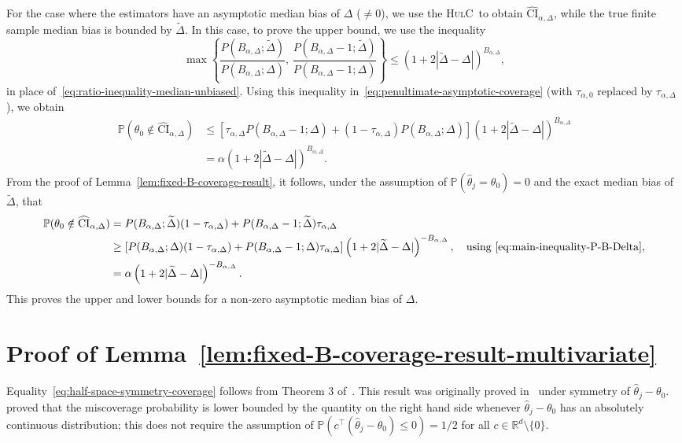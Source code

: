 \documentclass{article}
\newcommand{\hulc}{\textsc{HulC}~}
\numberwithin{myalgctr}{section}
\begin{document}
For the case where the estimators have an asymptotic median bias of $\Delta$ ($\neq 0$), we use the \hulc to obtain $\widehat{\mathrm{CI}}_{\alpha,\Delta}$, while the true finite sample median bias is bounded by $\widetilde{\Delta}$. In this case, to prove the upper bound, we use the inequality
\[
\max\left\{\frac{P(B_{\alpha,\Delta}; \widetilde{\Delta})}{P(B_{\alpha,\Delta}; \Delta)},\,\frac{P(B_{\alpha,\Delta}-1; \widetilde{\Delta})}{P(B_{\alpha,\Delta} - 1; \Delta)}\right\} \le \left(1 + 2|\widetilde{\Delta} - \Delta|\right)^{B_{\alpha,\Delta}},
\]
in place of~\eqref{eq:ratio-inequality-median-unbiased}. Using this inequality in~\eqref{eq:penultimate-asymptotic-coverage} (with $\tau_{\alpha,0}$ replaced by $\tau_{\alpha,\Delta}$), we obtain
\begin{align*}
\mathbb{P}(\theta_0 \notin \widehat{\mathrm{CI}}_{\alpha,\Delta}) &\le \left[\tau_{\alpha,\Delta}P(B_{\alpha,\Delta} - 1; \Delta) + (1 - \tau_{\alpha,\Delta})P(B_{\alpha,\Delta}; \Delta)\right]\left(1 + 2|\widetilde{\Delta} - \Delta|\right)^{B_{\alpha,\Delta}}\\ 
&= \alpha\left(1 + 2|\widetilde{\Delta} - \Delta|\right)^{B_{\alpha,\Delta}}.
\end{align*}
From the proof of Lemma~\ref{lem:fixed-B-coverage-result}, it follows, under the assumption of $\mathbb{P}(\widehat{\theta}_j = \theta_0) = 0$ and the exact median bias of $\widetilde{\Delta}$, that
\begin{align*}
\mathbb{P}(\theta_0 \notin \widehat{\mathrm{CI}}_{\alpha,\Delta}) 
&= P(B_{\alpha,\Delta}; \widetilde{\Delta})(1 - \tau_{\alpha,\Delta}) + P(B_{\alpha,\Delta} - 1; \widetilde{\Delta})\tau_{\alpha,\Delta}\\
&\ge \left[P(B_{\alpha,\Delta}; \Delta)(1 - \tau_{\alpha,\Delta}) + P(B_{\alpha,\Delta} - 1; \Delta)\tau_{\alpha,\Delta}\right]\left(1 + 2|\widetilde{\Delta} - \Delta|\right)^{-B_{\alpha,\Delta}},\quad\mbox{using~\eqref{eq:main-inequality-P-B-Delta},}\\
&= \alpha\left(1 + 2|\widetilde{\Delta} - \Delta|\right)^{-B_{\alpha,\Delta}}.
\end{align*}
This proves the upper and lower bounds for a non-zero asymptotic median bias of $\Delta$.
\section{Proof of Lemma~\ref{lem:fixed-B-coverage-result-multivariate}}\label{appsec:fixed-B-coverage-result-multivariate}
Equality~\eqref{eq:half-space-symmetry-coverage} follows from Theorem 3 of~\cite{hayakawa2021estimating}. This result was originally proved in~\cite{wendel1962problem} under symmetry of $\widehat{\theta}_j - \theta_0$. \cite{wagner2001continuous} proved that the miscoverage probability is lower bounded by the quantity on the right hand side whenever $\widehat{\theta}_j - \theta_0$ has an absolutely continuous distribution; this does not require the assumption of $\mathbb{P}(c^{\top}(\widehat{\theta}_j - \theta_0) \le 0) = 1/2$ for all $c\in\mathbb{R}^d\setminus\{0\}$.
\end{document}
